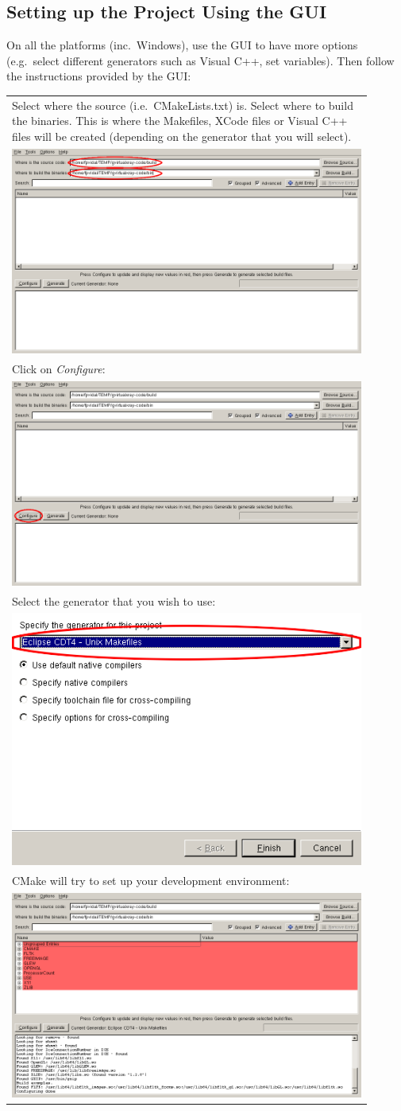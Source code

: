 \documentclass[11pt,oneside,a4paper,final]{article}
\begin{document}
\subsection{Setting up the Project Using the GUI}
On all the platforms (inc.~Windows), use the \gls{GUI} to have more options (e.g.~select different generators such as Visual C++, set variables). Then follow the instructions provided by the \Gls{GUI}:
\begin{center}
	\begin{longtable}{|p{0.9\linewidth}|}
		\hline
		Select where the source (i.e.~CMakeLists.txt) is.
		Select where to build the binaries. This is where the Makefiles, XCode files or Visual C++ files will be created (depending on the generator that you will select).\\
		\includegraphics[width=0.5\linewidth]{cmake-01}\\
		\hline
		
		Click on \emph{Configure}:\\
		\includegraphics[width=0.5\linewidth]{cmake-02}\\
		\hline

		Select the generator that you wish to use:\\
		\includegraphics[width=0.35\linewidth]{cmake-03}\\
		\hline

		CMake will try to set up your development environment:\\
		\includegraphics[width=0.5\linewidth]{cmake-04}\\
		\hline


\end{longtable}
\end{center}
\end{document}
